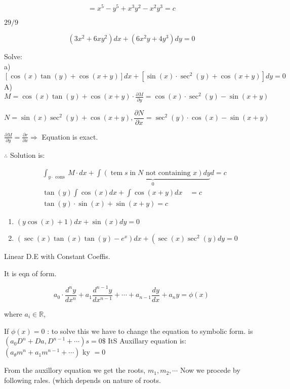 \documentclass[12pt, a4paper]{article}
\begin{document}
$$
	=x^{5}-y^{5}+x^{3} y^2-x^2 y^{3}=c
$$

$29 / 9$

$$
	\left(3 x^2 +6 x y^2\right) d x+\left(6 x^2 y+4 y^{3}\right) d y=0
$$

Solve:\\
a) $[\cos(x) \tan(y)+\cos(x+y)] d x+\left[\sin(x) \cdot \sec ^{2}(y)+\cos(x+y)\right] d y=0$\\
A) $M=\cos(x) \tan(y)+\cos(x+y) \cdot \frac{\partial M}{\partial y}=\cos(x) \cdot \sec ^{2}(y)-\sin(x+y)$

$$
	N=\sin(x) \sec ^{2}(y)+\cos(x+y), \frac{\partial N}{\partial x}=\sec ^{2}(y) \cdot \cos(x)-\sin(x+y)
$$

$\frac{\partial M}{\partial y}=\frac{\partial r}{\partial x} \Rightarrow$ Equation is exact.

$\therefore$ Solution is:

$$
	\begin{aligned}
		 & \int_{y \cdot \text{ cons }} M \cdot d x+\underbrace{\int(\operatorname{tem} s \operatorname{in} N \text{ not containing } x) d y}_{0} d=c \\
		 & \tan(y) \int \cos(x) d x+\int \cos(x+y) d x \quad=c                                                                                        \\
		 & \tan(y) \cdot \sin(x)+\sin(x+y)=c
	\end{aligned}
$$

\begin{enumerate}
	\item $(y \cos(x)+1) d x+\sin(x) d y=0$

	\item $\left(\sec (x) \tan(x) \tan(y)-e^{x}\right) d x+\left(\sec (x) \sec ^{2}(y) d y=0\right.$

\end{enumerate}

Linear D.E with Constant Coeffis.

It is eqn of form.

$$
	a_{0} \cdot \frac{d^{n} y}{d x^{n}}+a_{1} \frac{d^{n-1} y}{d x^{n-1}}+\cdots+a_{n-1} \frac{d y}{d x}+a_{n} y=\phi(x)
$$

where $a_{i} \in \mathbb{R}$,

If $\phi(x)=0$ : to solve this we have to change the equation to symbolic form. is $\left(a_{0} D^{n}+D a, D^{n-1}+\cdots\right) s=0 \$$ ItS Auxillary equation is: $\left(a_{\theta} m^{n}+a_{1} m^{n-1}+\cdots\right)$ ky $=0$

	From the auxillory equation we get the roots, $m_{1}, m_{2}, \cdots$ Now we procede by following rales. (which depends on nature of roots.
\end{document}
